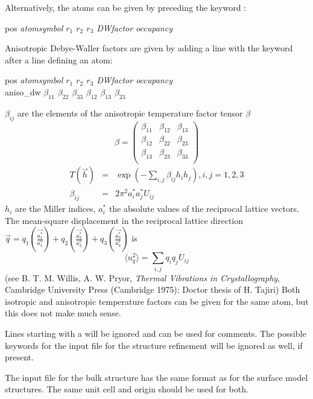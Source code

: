 \documentclass[a4paper]{article}
\begin{document}
Alternatively, the atoms can be given by preceding the keyword
:
\begin{filestruc}
pos {\em atomsymbol $r_1$ $r_2$ $r_3$ DWfactor occupancy}
\end{filestruc}
Anisotropic Debye-Waller factors are given by adding a line with the
keyword  after a line defining an atom:
\begin{filestruc}
pos {\em atomsymbol $r_1$ $r_2$ $r_3$ DWfactor occupancy} \\
aniso\_dw {\em $\beta_{11}$ $\beta_{22}$ $\beta_{33}$ $\beta_{12}$
 $\beta_{13}$ $\beta_{23}$}
\end{filestruc}
$\beta_{ij}$ are the elements of the anisotropic temperature factor
tensor $\beta$
\begin{displaymath}
\beta = 
\left(\begin{array}{ccc}
\beta_{11} & \beta_{12} & \beta_{13}\\
\beta_{12} & \beta_{22} & \beta_{23}\\
\beta_{13} & \beta_{23} & \beta_{33}\\
\end{array} \right) 
\end{displaymath}
\begin{eqnarray}
T(\vec{h}) & = & \exp\left(-\sum_{i,j}\beta_{ij}h_ih_j\right), i,j = 1,2,3
 \\
\beta_{ij} & = & 2\pi^2 a_i^*a_j^*U_{ij}
\end{eqnarray}
$h_i $ are the Miller indices, $a_i^*$ the absolute values of the reciprocal lattice
vectors. The mean-square displacement in the reciprocal lattice
direction $\vec{q} = q_1(\frac{\vec{a_1^*}}{a_1^*})
+q_2(\frac{\vec{a_2^*}}{a_2^*})+ q_3(\frac{\vec{a_3^*}}{a_3^*})$ is 
\begin{displaymath}
\langle u_q^2\rangle = \sum_{i,j} q_iq_j U_{ij}
\end{displaymath}
(see B. T. M. Willis, A. W. Pryor, {\em Thermal Vibrations in
Crystallography}, Cambridge University Press (Cambridge 1975); Doctor
thesis of H. Tajiri)
Both isotropic and anisotropic temperature factors can be given for the
same atom, but this does not make much sense.

Lines starting with a \fkey{\#} will be ignored and can be used for
comments. The possible keywords for the input file for the structure
refinement will be ignored as well, if present.


The input file for the bulk structure has the same format as for the
surface model structures. The same unit cell and origin should be used for both.
\end{document}
